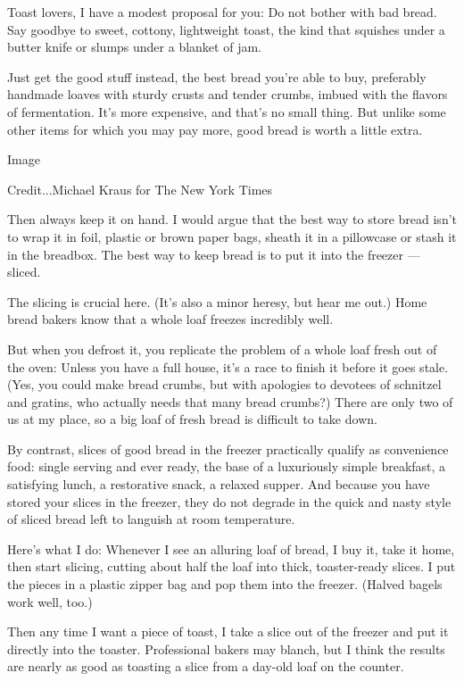 Toast lovers, I have a modest proposal for you: Do not bother with bad
bread. Say goodbye to sweet, cottony, lightweight toast, the kind that
squishes under a butter knife or slumps under a blanket of jam.

Just get the good stuff instead, the best bread you're able to buy,
preferably handmade loaves with sturdy crusts and tender crumbs, imbued
with the flavors of fermentation. It's more expensive, and that's no
small thing. But unlike some other items for which you may pay more,
good bread is worth a little extra.

Image

Credit...Michael Kraus for The New York Times

Then always keep it on hand. I would argue that the best way to store
bread isn't to wrap it in foil, plastic or brown paper bags, sheath it
in a pillowcase or stash it in the breadbox. The best way to keep bread
is to put it into the freezer --- sliced.

The slicing is crucial here. (It's also a minor heresy, but hear me
out.) Home bread bakers know that a whole loaf freezes incredibly well.

But when you defrost it, you replicate the problem of a whole loaf fresh
out of the oven: Unless you have a full house, it's a race to finish it
before it goes stale. (Yes, you could make bread crumbs, but with
apologies to devotees of schnitzel and gratins, who actually needs that
many bread crumbs?) There are only two of us at my place, so a big loaf
of fresh bread is difficult to take down.

By contrast, slices of good bread in the freezer practically qualify as
convenience food: single serving and ever ready, the base of a
luxuriously simple breakfast, a satisfying lunch, a restorative snack, a
relaxed supper. And because you have stored your slices in the freezer,
they do not degrade in the quick and nasty style of sliced bread left to
languish at room temperature.

Here's what I do: Whenever I see an alluring loaf of bread, I buy it,
take it home, then start slicing, cutting about half the loaf into
thick, toaster-ready slices. I put the pieces in a plastic zipper bag
and pop them into the freezer. (Halved bagels work well, too.)

Then any time I want a piece of toast, I take a slice out of the freezer
and put it directly into the toaster. Professional bakers may blanch,
but I think the results are nearly as good as toasting a slice from a
day-old loaf on the counter.

